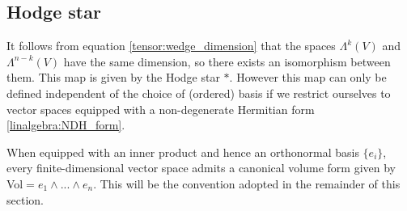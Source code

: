 \subsection{Hodge star}

	It follows from equation \ref{tensor:wedge_dimension} that the spaces $\Lambda^k(V)$ and $\Lambda^{n-k}(V)$ have the same dimension, so there exists an isomorphism between them. This map is given by the Hodge star $\ast$. However this map can only be defined independent of the choice of (ordered) basis if we restrict ourselves to vector spaces equipped with a non-degenerate Hermitian form \ref{linalgebra:NDH_form}.

	When equipped with an inner product and hence an orthonormal basis $\{e_i\}$, every finite-dimensional vector space admits a canonical volume form given by Vol$ = e_1\wedge...\wedge e_n$. This will be the convention adopted in the remainder of this section.

	
